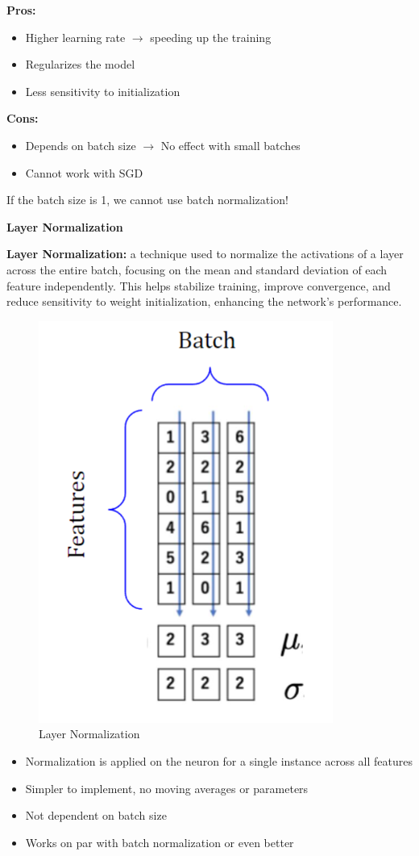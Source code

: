\noindent\textbf{Pros:}
\begin{itemize}
\item Higher learning rate $\rightarrow$ speeding up the training
\item Regularizes the model
\item Less sensitivity to initialization
\end{itemize}
\textbf{Cons:}
\begin{itemize}
\item Depends on batch size $\rightarrow$ No effect with small batches
\item Cannot work with SGD\\
\end{itemize}

\begin{warning}
    If the batch size is 1, we cannot use batch normalization!
\end{warning}

\noindent\textbf{Layer Normalization}

\begin{definition}
    \textbf{Layer Normalization:} a technique used to normalize the activations of a layer across the entire batch, focusing on the mean and standard deviation of each feature independently. This helps stabilize training, improve convergence, and reduce sensitivity to weight initialization, enhancing the network's performance.
\end{definition}

\begin{figure}[h!t]
    \centering
    \includegraphics[width=0.25\linewidth]{layernorm.png}
    \caption{Layer Normalization}
    \label{fig:enter-label}
\end{figure}

\begin{itemize}
    \item Normalization is applied on the neuron for a single instance across all features
    \item Simpler to implement, no moving averages or parameters
    \item Not dependent on batch size
    \item Works on par with batch normalization or even better
\end{itemize}

